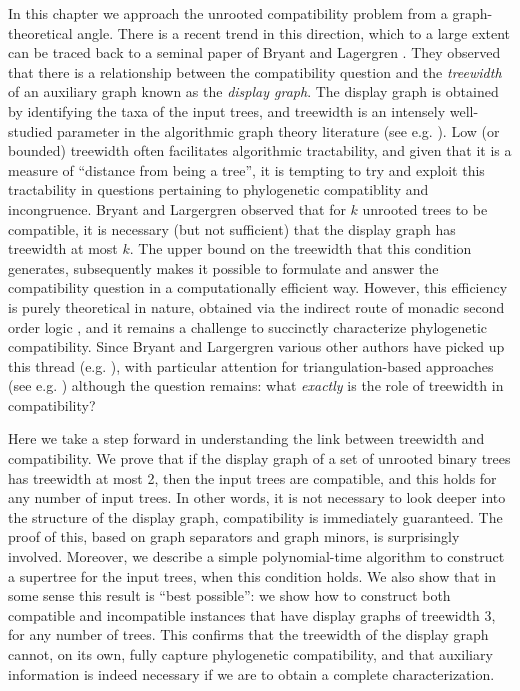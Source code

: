 In this chapter we approach the unrooted compatibility problem from a graph-theoretical angle. There is a recent trend in this direction, which to a large extent can be traced back to a seminal paper of Bryant and Lagergren \cite{BryLag06}. They observed that there is a relationship between the compatibility question and the \emph{treewidth} of an auxiliary graph known as the \emph{display graph}. The display graph is obtained by identifying the taxa of the input trees, and treewidth is an intensely well-studied parameter in the algorithmic graph theory literature (see e.g. \cite{BodlaenderK10}). Low (or bounded) treewidth often facilitates algorithmic tractability, and given that it is a measure of ``distance from being a tree'', it is tempting to try and exploit this tractability in questions pertaining to phylogenetic compatiblity and incongruence. Bryant and Largergren observed that for $k$ unrooted trees to be compatible, it is necessary (but not sufficient) that the display graph has treewidth at most $k$. The upper bound on the treewidth that this condition generates, subsequently makes it possible to formulate and answer the compatibility question in a computationally efficient way. However, this efficiency is purely theoretical in nature, obtained via the indirect route of monadic second order logic \cite{courcelle1990monadic}, and it remains a challenge to succinctly characterize phylogenetic compatibility. Since Bryant and Largergren various other authors have picked up this thread (e.g. \cite{GruHum08}), with particular attention for triangulation-based approaches (see e.g. \cite{vakati2011graph,gysel2012reducing,VakBac13}) although the question remains: what \emph{exactly} is the role of treewidth in compatibility?

Here we take a step forward in understanding the link between treewidth and compatibility. We prove that if the display graph of a set of unrooted binary trees has treewidth at most 2, then the input trees are compatible, and this holds for any number of input trees. In other words, it is not necessary to look deeper into the structure of the display graph, compatibility is immediately guaranteed. The proof of this, based on graph separators and graph minors, is surprisingly involved. Moreover, we describe a simple polynomial-time algorithm to construct a supertree for the input trees, when this condition holds. We also show that in some sense this result is ``best possible'': we show how to construct both compatible and incompatible instances that have display graphs of treewidth 3, for any number of trees. This confirms that the treewidth of the display graph cannot, on its own, fully capture phylogenetic compatibility, and that auxiliary information is indeed necessary if we are to obtain a complete characterization. 

